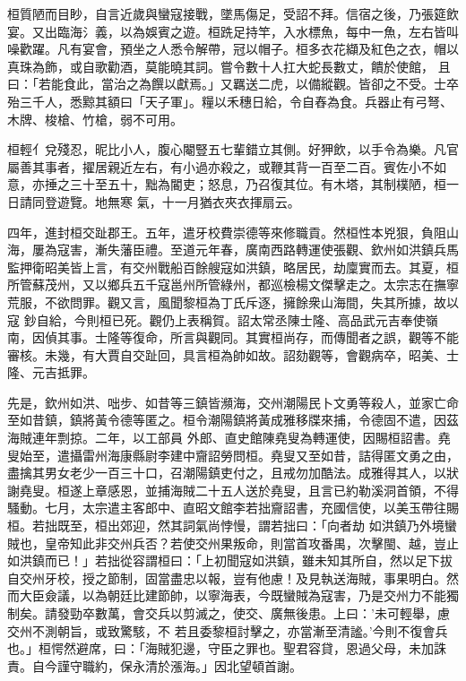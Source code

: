 \begin{pinyinscope}
 桓質陋而目眇，自言近歲與蠻寇接戰，墜馬傷足，受詔不拜。信宿之後，乃張筵飲宴。又出臨海氵義，以為娛賓之遊。桓跣足持竿，入水標魚，每中一魚，左右皆叫噪歡躍。凡有宴會，預坐之人悉令解帶，冠以帽子。桓多衣花纈及紅色之衣，帽以真珠為飾，或自歌勸酒，莫能曉其詞。嘗令數十人扛大蛇長數丈，饋於使館，
 且曰：「若能食此，當治之為饌以獻焉。」又羈送二虎，以備縱觀。皆卻之不受。士卒殆三千人，悉黥其額曰「天子軍」。糧以禾穗日給，令自舂為食。兵器止有弓弩、木牌、梭槍、竹槍，弱不可用。



 桓輕亻兌殘忍，昵比小人，腹心閹豎五七輩錯立其側。好狎飲，以手令為樂。凡官屬善其事者，擢居親近左右，有小過亦殺之，或鞭其背一百至二百。賓佐小不如意，亦捶之三十至五十，黜為閽吏；怒息，乃召復其位。有木塔，其制樸陋，桓一日請同登遊覽。地無寒
 氣，十一月猶衣夾衣揮扇云。



 四年，進封桓交趾郡王。五年，遣牙校費崇德等來修職貢。然桓性本兇狠，負阻山海，屢為寇害，漸失藩臣禮。至道元年春，廣南西路轉運使張觀、欽州如洪鎮兵馬監押衛昭美皆上言，有交州戰船百餘艘寇如洪鎮，略居民，劫廩實而去。其夏，桓所管蘇茂州，又以鄉兵五千寇邕州所管綠州，都巡檢楊文傑擊走之。太宗志在撫寧荒服，不欲問罪。觀又言，風聞黎桓為丁氏斥逐，擁餘衆山海間，失其所據，故以寇
 鈔自給，今則桓已死。觀仍上表稱賀。詔太常丞陳士隆、高品武元吉奉使嶺南，因偵其事。士隆等復命，所言與觀同。其實桓尚存，而傳聞者之誤，觀等不能審核。未幾，有大賈自交趾回，具言桓為帥如故。詔劾觀等，會觀病卒，昭美、士隆、元吉抵罪。



 先是，欽州如洪、咄步、如昔等三鎮皆瀕海，交州潮陽民卜文勇等殺人，並家亡命至如昔鎮，鎮將黃令德等匿之。桓令潮陽鎮將黃成雅移牒來捕，令德固不遣，因茲海賊連年剽掠。二年，以工部員
 外郎、直史館陳堯叟為轉運使，因賜桓詔書。堯叟始至，遣攝雷州海康縣尉李建中齎詔勞問桓。堯叟又至如昔，詰得匿文勇之由，盡擒其男女老少一百三十口，召潮陽鎮吏付之，且戒勿加酷法。成雅得其人，以狀謝堯叟。桓遂上章感恩，並捕海賊二十五人送於堯叟，且言已約勒溪洞首領，不得騷動。七月，太宗遣主客郎中、直昭文館李若拙齎詔書，充國信使，以美玉帶往賜桓。若拙既至，桓出郊迎，然其詞氣尚悖慢，謂若拙曰：「向者劫
 如洪鎮乃外境蠻賊也，皇帝知此非交州兵否？若使交州果叛命，則當首攻番禺，次擊閩、越，豈止如洪鎮而已！」若拙從容謂桓曰：「上初聞寇如洪鎮，雖未知其所自，然以足下拔自交州牙校，授之節制，固當盡忠以報，豈有他慮！及見執送海賊，事果明白。然而大臣僉議，以為朝廷比建節帥，以寧海表，今既蠻賊為寇害，乃是交州力不能獨制矣。請發勁卒數萬，會交兵以剪滅之，使交、廣無後患。上曰：'未可輕舉，慮交州不測朝旨，或致驚駭，不
 若且委黎桓討擊之，亦當漸至清謐。'今則不復會兵也。」桓愕然避席，曰：「海賊犯邊，守臣之罪也。聖君容貸，恩過父母，未加誅責。自今謹守職約，保永清於漲海。」因北望頓首謝。




\end{pinyinscope}
